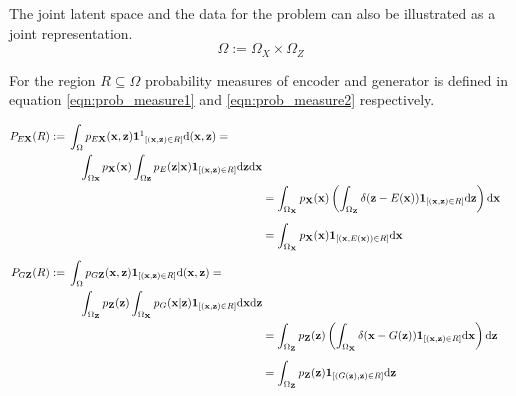 The joint latent space and the data for the problem can also be illustrated as a joint
representation.
$$
\Omega := \Omega_{X} \times \Omega_{Z}
$$

For the region $R \subseteq \Omega$ probability
measures\cite{RePEc:eee:csdana:v:20:y:1995:i:6:p:703-702} of encoder and generator is defined in
equation \ref{eqn:prob_measure1} and \ref{eqn:prob_measure2} respectively.\cite{Donahue2017AdversarialFL}

 \begin{align}
    \begin{split}\label{eqn:prob_measure1}
    P_{E \mathbf{X}}(R)  :={}&\int_{\Omega} p_{E \mathbf{X}}(\mathbf{x}, \mathbf{z})
    \mathbf{1\footnotemark}_{[(\mathbf{x}, \mathbf{z}) \in R]} \mathrm{d}(\mathbf{x}, \mathbf{z})= \\ 
    & \quad \int_{\Omega \mathbf{x}} p_{\mathbf{X}}(\mathbf{x}) \int_{\Omega \mathbf{z}} p_{E}(\mathbf{z} | \mathbf{x})
    \mathbf{1}_{[(\mathbf{x}, \mathbf{z}) \in R]} \mathrm{d} \mathbf{z} \mathrm{d} \mathbf{x}       
    \end{split}\\
    {}&=\int_{\Omega_{\mathbf{X}}} p_{\mathbf{X}}(\mathbf{x})\left(\int_{\Omega_{\mathbf{Z}}} \delta(\mathbf{z}-E(\mathbf{x})) \mathbf{1}_{[(\mathbf{x}, \mathbf{z}) \in R]} \mathrm{d} \mathbf{z}\right) \mathrm{d} \mathbf{x} \\[5pt]
    {}& =\int_{\Omega_{\mathbf{X}}} p_{\mathbf{X}}(\mathbf{x}) \mathbf{1}_{[(\mathbf{x}, E(\mathbf{x})) \in R]} \mathrm{d} \mathbf{x} \\[5pt]
    \begin{split}\label{eqn:prob_measure2}
    P_{G \mathbf{Z}}(R) :={}&\int_{\Omega} p_{G \mathbf{Z}}(\mathbf{x}, \mathbf{z}) 
    \mathbf{1}_{[(\mathbf{x},\mathbf{z}) \in R]} \mathrm{d}(\mathbf{x}, \mathbf{z})= \\ 
    & \quad \int_{\Omega_{\mathbf{Z}}} p_{\mathbf{Z}}(\mathbf{z}) \int_{\Omega_{\mathbf{X}}} p_{G}(\mathbf{x} | \mathbf{z})
    \mathbf{1}_{[(\mathbf{x}, \mathbf{z}) \in R]} \mathrm{d} \mathbf{x} \mathrm{d} \mathbf{z} 
    \end{split}\\
    {}&=\int_{\Omega_{\mathbf{Z}}} p_{\mathbf{Z}}(\mathbf{z})\left(\int_{\Omega_{\mathbf{X}}} \delta(\mathbf{x}-G(\mathbf{z})) \mathbf{1}_{[(\mathbf{x}, \mathbf{z}) \in R]} \mathrm{d} \mathbf{x}\right) \mathrm{d} \mathbf{z} \\[5pt]
    {}& =\int_{\Omega_{\mathbf{Z}}} p_{\mathbf{Z}}(\mathbf{z}) \mathbf{1}_{[(G(\mathbf{z}), \mathbf{z}) \in R]} \mathrm{d} \mathbf{z}
\end{align}        

